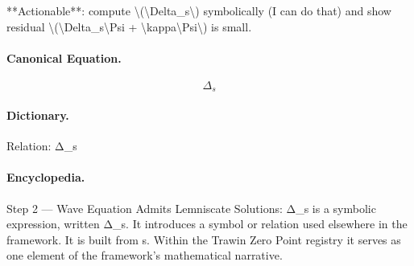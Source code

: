 **Actionable**: compute \textbackslash{}(\textbackslash{}Delta\_s\textbackslash{}) symbolically (I can do that) and show residual \textbackslash{}(\textbackslash{}Delta\_s\textbackslash{}Psi + \textbackslash{}kappa\textbackslash{}Psi\textbackslash{}) is small.

\paragraph{Canonical Equation.}
\[
\Delta_s
\]

\paragraph{Dictionary.}
Relation: Δ\_s

\paragraph{Encyclopedia.}
Step 2 — Wave Equation Admits Lemniscate Solutions: Δ\_s is a symbolic expression, written Δ\_s. It introduces a symbol or relation used elsewhere in the framework. It is built from s. Within the Trawin Zero Point registry it serves as one element of the framework's mathematical narrative.
